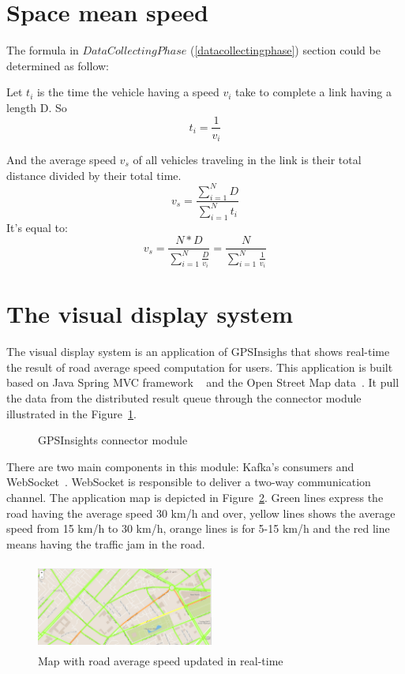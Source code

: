 \documentclass{acm_proc_article-sp}
\begin{document}
\section{Space mean speed}
The formula in $Data Collecting Phase$ (\ref{datacollectingphase}) section could be determined as follow:

Let $t_{i}$ is the time the vehicle having a speed $v_{i}$ take to complete a link having a length D. So
	\[ t_{i} = \frac{1}{v_{i}} \] 

And the average speed $v_{s}$ of all vehicles traveling in the link is their total distance divided by their total time.
	\[v_{s} = \frac{\sum_{i=1}^{N} D}{\sum_{i=1}^{N} t_{i}}\]
It's equal to:
	\[v_{s} = \frac{N \ast D}{\sum_{i=1}^{N} \frac{D}{v_{i}}} = \frac{N}{\sum_{i=1}^{N}\frac{1}{v_{i}}} \]

\section{The visual display system}

The visual display system is an application of GPSInsighs that shows real-time the result of road average speed computation for users. This application is built based on Java Spring MVC framework ~\cite{javaspringmvc} and the Open Street Map data~\cite{openstreetmap}. It pull the data from the distributed result queue through the connector module illustrated in the Figure~\ref{fig:connectmodule}.

\begin{figure}[h]
	\centering
	\caption{GPSInsights connector module}
	\label{fig:connectmodule}
\end{figure}

There are two main components in this module: Kafka's consumers and WebSocket~\cite{websocket}. WebSocket is responsible to deliver a two-way communication channel. The application map is depicted in Figure~\ref{fig:app}. Green lines express the road having the average speed 30 km/h and over, yellow lines shows the average speed from 15 km/h to 30 km/h, orange lines is for 5-15 km/h and the red line means having the traffic jam in the road. 

	\begin{figure}[h]
		\centering
		\includegraphics[height=110px,width=220px]{Picture1}
		\caption{Map with road average speed updated in real-time}
		\label{fig:app}
	\end{figure}
\end{document}
